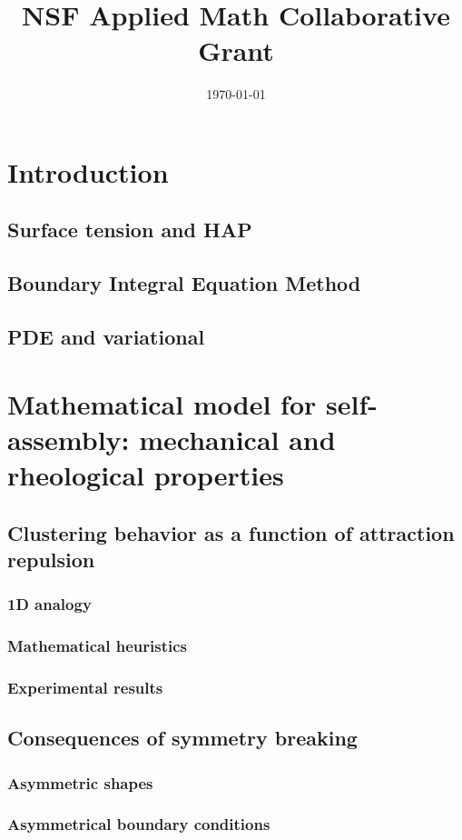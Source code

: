 \documentclass[preprint,11pt]{article}
\title{NSF Applied Math Collaborative Grant}
\author{}
\date{\today}
\begin{document}
\maketitle
\everymath{\displaystyle}

\section{Introduction}
\subsection{Surface tension and HAP}
\subsection{Boundary Integral Equation Method}
\subsection{PDE and variational }
\section{Mathematical model for self-assembly: mechanical and rheological properties}
\subsection{Clustering behavior as a function of attraction repulsion}
\subsubsection{1D analogy}
\subsubsection{Mathematical heuristics}
\subsubsection{Experimental results}
\subsection{Consequences of symmetry breaking}
\subsubsection{Asymmetric shapes}
\subsubsection{Asymmetrical boundary conditions}
\end{document}
